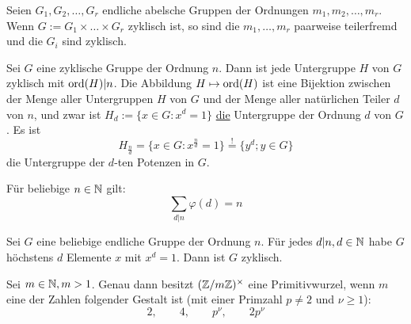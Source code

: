 \begin{falko} \label{satz_4.5}
	Seien $G_1,G_2,\dots,G_r$ endliche abelsche Gruppen der Ordnungen $m_1,m_2,\dots,m_r$. Wenn $G:= G_1 \times \dots \times G_r$ zyklisch ist, so sind die $m_1,\dots,m_r$ paarweise teilerfremd und die $G_i$ sind zyklisch.
\end{falko}

\begin{falko} \label{satz_4.6}
	Sei $G$ eine zyklische Gruppe der Ordnung $n$. Dann ist jede Untergruppe $H$ von $G$ zyklisch mit $\operatorname{ord}(H) | n$. Die Abbildung $H \mapsto \operatorname{ord}(H)$ ist eine Bijektion zwischen der Menge aller Untergruppen $H$ von $G$ und der Menge aller natürlichen Teiler $d$ von $n$, und zwar ist $H_d := \{x \in G : x^d = 1\}$ \underline{die} Untergruppe der Ordnung $d$ von $G$. Es ist
	\[ H_{\frac{n}{d}} = \{x \in G : x^{\frac{n}{d}}=1 \} \overset{!}{=} \{y^d ; y \in G\} \]
	die Untergruppe der $d$-ten Potenzen in $G$.
\end{falko}

	Für beliebige $n \in \mathbb{N}$ gilt:
	\[ \sum_{d | n} \varphi(d) = n \]
	
	Sei $G$ eine beliebige endliche Gruppe der Ordnung $n$. Für jedes $d | n, d \in \mathbb{N}$ habe $G$ höchstens $d$ Elemente $x$ mit $x^d = 1$. Dann ist $G$ zyklisch.
	
\begin{satz} \label{satz_4.4}
	Sei $m \in \mathbb{N}, m > 1$. Genau dann besitzt $(\mathbb{Z}/m\mathbb{Z})^\times$ eine Primitivwurzel, wenn $m$ eine der Zahlen folgender Gestalt ist (mit einer Primzahl $p \neq 2$ und $\nu \geq 1$):
	\[ 2, \qquad 4, \qquad p^\nu, \qquad 2p^\nu \]
\end{satz}
\newpage